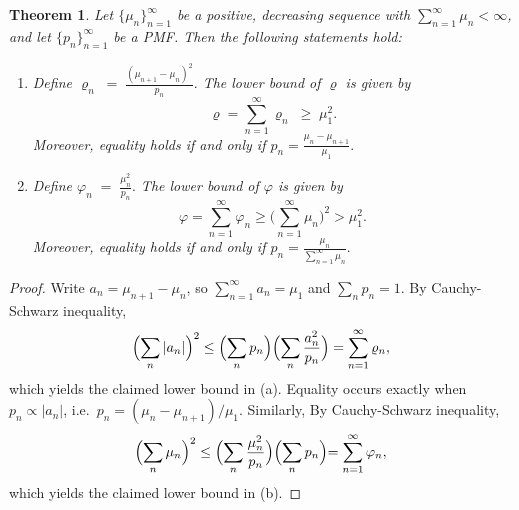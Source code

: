\documentclass{article}
\theoremstyle{definition}
\theoremstyle{plain}
\newtheorem{theorem}[definition]{Theorem}
\theoremstyle{remark}
\begin{document}
\begin{theorem}\label{prop:lower_bound_varrho-appendix}
Let $\{\mu_n\}_{n=1}^\infty$ be a positive, decreasing sequence with   $\sum_{n=1}^\infty\mu_n<\infty$, and let $\{p_n\}_{n=1}^\infty$ be a PMF.   Then the following statements hold:
\begin{enumerate}[label=(\alph*)]
    \item Define $\varrho_n \;=\; \frac{(\mu_{n+1}-\mu_n)^2}{p_n}.$   The lower bound of $\varrho$ is given by 
    $$\varrho = \sum_{n=1}^\infty \varrho_n \;\ge\; \mu_1^2.$$  
    Moreover, equality holds if and only if
$p_n = \frac{\mu_n - \mu_{n+1}}{\mu_1}.$ 
    \item  Define $\varphi_n \;=\; \frac{ \mu_n^2}{p_n}.$   The lower bound of $\varphi$ is given by 
    $$\varphi= \sum_{n=1}^\infty \varphi_n \geq \Big( \sum_{n=1}^\infty \mu_n \Big)^2> \mu_1^2.$$
    Moreover, equality holds if and only if
$p_n = \frac{\mu_n }{\sum_{n=1}^\infty \mu_n }.$ 
\end{enumerate}
\end{theorem} 
\begin{proof}
Write $a_n=\mu_{n+1}-\mu_n$, so $\sum_{n=1}^\infty a_n=\mu_1$  and $\sum_n p_n=1$.  By Cauchy-Schwarz inequality,
\[
\Bigl(\sum_n |a_n|\Bigr)^2
\le
\Bigl(\sum_n p_n\Bigr)
\Bigl(\sum_n \frac{a_n^2}{p_n}\Bigr)
=
\sum_{n=1}^\infty \varrho_n,
\]
which yields the claimed lower bound in (a).  Equality occurs exactly when $p_n\propto|a_n|$, i.e.\ $p_n=(\mu_n-\mu_{n+1})/\mu_1$. Similarly,  By Cauchy-Schwarz inequality, 
$$\Bigl( \sum_n \mu_n  \Bigr)^2 \leq\Bigl( \sum_n  \frac{\mu^2_n}{p_n} \Bigr) \Bigl( \sum_n p_n  \Bigl) = \sum_{n=1}^\infty \varphi_n,$$
which yields the claimed lower bound in (b). 
\end{proof} 
\end{document}
